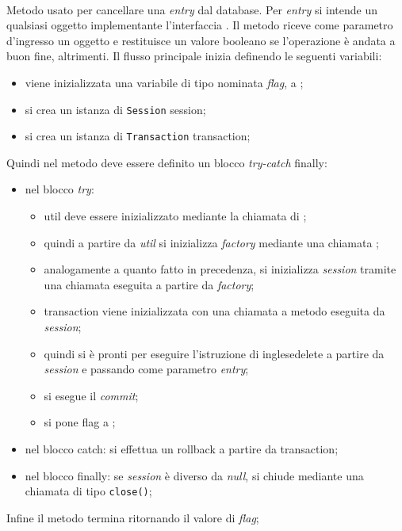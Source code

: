 \begin{description}
	\item{}\\
	Metodo usato per cancellare una \textit{entry} dal database. Per \textit{entry} si intende un qualsiasi oggetto implementante l'interfaccia . Il metodo riceve come parametro d'ingresso un oggetto  e restituisce un valore booleano  se l'operazione è andata a buon fine,  altrimenti. Il flusso principale inizia definendo le seguenti variabili:
	\begin{itemize}
		\item viene inizializzata una variabile di tipo  nominata \textit{flag}, a ;
		\item si crea un istanza di \texttt{Session} session;
		\item si crea un istanza di \texttt{Transaction} transaction;
	\end{itemize}
	Quindi nel metodo deve essere definito un blocco \textit{try-catch} finally:
	\begin{itemize}
		\item nel blocco \textit{try}:
		\begin{itemize}
			\item util deve essere inizializzato mediante la chiamata  di ;
			\item quindi a partire da \textit{util} si inizializza \textit{factory} mediante una chiamata ;
			\item analogamente a quanto fatto in precedenza, si inizializza \textit{session} tramite una chiamata  eseguita a partire da \textit{factory};
			\item transaction viene inizializzata con una chiamata a metodo  eseguita da \textit{session};
			\item quindi si è pronti per eseguire l'istruzione di inglese{delete} a partire da \textit{session} e passando come parametro \textit{entry};
			\item si esegue il \textit{commit};
			\item si pone flag a ;
		\end{itemize}
		\item nel blocco catch: si effettua un rollback a partire da transaction;
		\item nel blocco finally: se \textit{session} è diverso da \textit{null}, si chiude mediante una chiamata di tipo \texttt{close()};
	\end{itemize}
	Infine il metodo termina ritornando il valore di \textit{flag};
	

\end{description}
